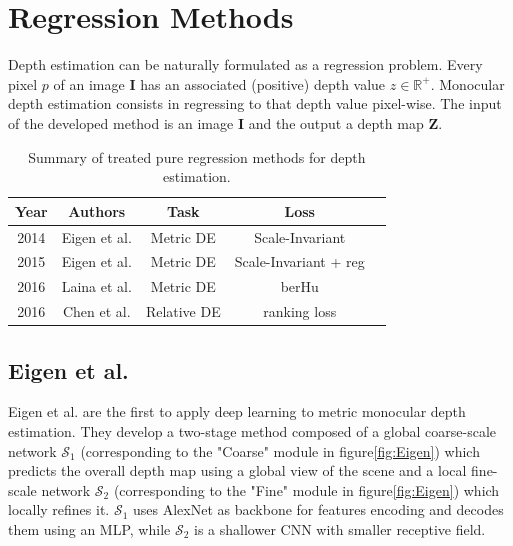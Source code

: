 \section{Regression Methods}
Depth estimation can be naturally formulated as a regression problem.
Every pixel $p$ of an image $\mathbf{I}$ has an associated (positive) depth value $z \in \mathbb{R}^{+}$.
Monocular depth estimation consists in regressing to that depth value pixel-wise.
The input of the developed method is an image $\mathbf{I}$ and the output a depth map $\mathbf{Z}$.

\label{sec:regression_methods}

\begin{center}
	\begin{table}
		\begin{tabular}{| c | c | c | c | c |}
			\hline
			\textbf{Year} & \textbf{Authors} & \textbf{Task} & \textbf{Loss} \\
			\hline
			2014 & Eigen et al. \cite{Eigen} & Metric DE & Scale-Invariant \\
			2015 & Eigen et al. \cite{Eigen2} & Metric DE & Scale-Invariant + reg \\
			2016 & Laina et al. \cite{Laina} & Metric DE & berHu \\
			2016 & Chen et al. \cite{DIW} & Relative DE & ranking loss \\
			\hline
		\end{tabular}
		\caption{Summary of treated pure regression methods for depth estimation. \label{table:1}}
	\end{table}
\end{center}

\subsection{Eigen et al.}
Eigen et al. \cite{Eigen} are the first to apply deep learning to metric monocular depth estimation.
They develop a two-stage method composed of a global coarse-scale network $\mathcal{S}_{1}$ (corresponding to the "Coarse" module in figure\ref{fig:Eigen}) which predicts the overall depth map using a global view of the scene and a local fine-scale network $\mathcal{S}_{2}$ (corresponding to the "Fine" module in figure\ref{fig:Eigen}) which locally refines it.
$\mathcal{S}_{1}$ uses AlexNet \cite{AlexNet} as backbone for features encoding and decodes them using an MLP, while $\mathcal{S}_{2}$ is a shallower CNN with smaller receptive field.

